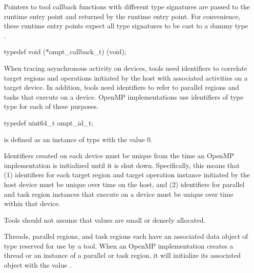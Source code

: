 Pointers to tool callback functions with different type
signatures are passed to the  runtime entry point and
returned by the  runtime entry point. For convenience,
these runtime entry points expect all type signatures to be cast to
a dummy type .


\begin{ccppspecific}
\begin{omptCallback}
typedef void (*ompt_callback_t) (void);
\end{omptCallback}
\end{ccppspecific}



\label{sec:ompt_id_t}
When tracing asynchronous activity on devices, tools need identifiers to correlate target regions and operations initiated by the host with
associated activities on a target device. In addition, tools need identifiers to refer to parallel regions and tasks that execute on a device.
OpenMP implementations use identifiers of type  type for each of these 
purposes.

\begin{ccppspecific}
\begin{omptOther}
typedef uint64_t ompt_id_t;
\end{omptOther}
\end{ccppspecific}

 is defined as an instance of type  with the value 0.

Identifiers created on each device must be unique from the time an OpenMP implementation is initialized until it is shut down.
Specifically, this means that (1) identifiers for each target region and target operation instance initiated by the host device must be unique over time on the host,
and (2) identifiers for parallel and task region instances that execute on a device must be unique over time within that device.

Tools should not assume that  values are small or densely allocated.


\label{sec:ompt_data_t}
Threads, parallel regions, and task regions
each have an associated data object of type  reserved for use by a tool.
When an OpenMP implementation creates a thread or an instance of a parallel or task region,
it will initialize its associated  object with the value .


